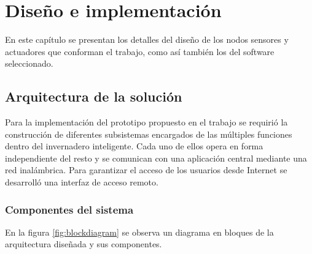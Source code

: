 

\chapter{Diseño e implementación} %

\label{Chapter3} %



En este capítulo se presentan los detalles del diseño de los nodos sensores y actuadores que conforman el trabajo, como así también los del software seleccionado.

\section{Arquitectura de la solución}
\label{sec:Arquitectura de la solución}


Para la implementación del prototipo propuesto en el trabajo se requirió la construcción de diferentes subsistemas encargados de las múltiples funciones dentro del invernadero inteligente. Cada uno de ellos opera en forma independiente del resto y se comunican con una aplicación central mediante una red inalámbrica. 
Para garantizar el acceso de los usuarios desde Internet se desarrolló una interfaz de acceso remoto.





\subsection{Componentes del sistema}
\label{Componentes del sistema}

En la figura \ref{fig:blockdiagram} se observa un diagrama en bloques de la arquitectura diseñada y sus componentes.

